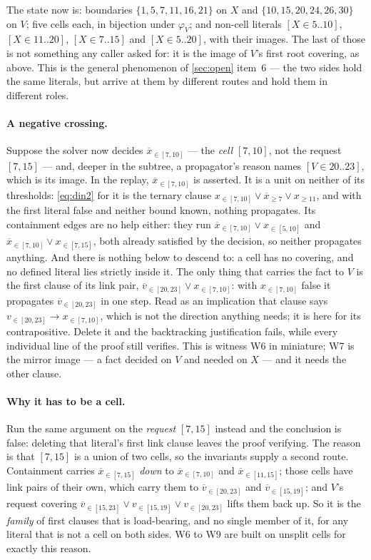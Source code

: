 \documentclass[11pt,a4paper]{article}
\theoremstyle{plain}
\theoremstyle{definition}
\theoremstyle{remark}
\newcommand{\atge}[2]{#1_{\geq #2}}
\newcommand{\atin}[3]{#1_{\in[#2,#3]}}
\newcommand{\natge}[2]{\overline{#1}_{\geq #2}}
\newcommand{\natin}[3]{\overline{#1}_{\in[#2,#3]}}
\begin{document}
The state now is: boundaries $\{1,5,7,11,16,21\}$ on $X$ and
$\{10,15,20,24,26,30\}$ on $V$; five cells each, in bijection under $\varphi_V$;
and non-cell literals $[X\in 5..10]$, $[X\in 11..20]$, $[X\in 7..15]$ and
$[X\in 5..20]$, with their images.  The last of those is not something any
caller asked for: it is the image of $V$'s first root covering, as above.  This
is the general phenomenon of \cref{sec:open} item~6 --- the two sides hold the
same literals, but arrive at them by different routes and hold them in different
roles.

\paragraph{A negative crossing.}
Suppose the solver now decides $\natin{x}{7}{10}$ --- the \emph{cell} $[7,10]$,
not the request $[7,15]$ --- and, deeper in the subtree, a propagator's reason
names $[V\in 20..23]$, which is its image.  In the replay,
$\natin{x}{7}{10}$ is asserted.  It is a unit on neither of its thresholds:
\cref{eq:din2} for it is the ternary clause
$\atin{x}{7}{10}\vee\natge{x}{7}\vee\atge{x}{11}$, and with the first literal
false and neither bound known, nothing propagates.  Its containment edges are no
help either: they run $\natin{x}{7}{10}\vee\atin{x}{5}{10}$ and
$\natin{x}{7}{10}\vee\atin{x}{7}{15}$, both already satisfied by the decision, so
neither propagates anything.  And there is nothing below to descend to: a cell
has no covering, and no defined literal lies strictly inside it.  The only thing
that
carries the fact to $V$ is the first clause of its link pair,
$\natin{v}{20}{23}\vee\atin{x}{7}{10}$: with $\atin{x}{7}{10}$ false it
propagates $\natin{v}{20}{23}$ in one step.  Read as an implication that clause
says $\atin{v}{20}{23}\to\atin{x}{7}{10}$, which is not the direction anything
needs; it is here for its contrapositive.  Delete it and the backtracking
justification fails, while every individual line of the proof still verifies.
This is witness W6 in miniature; W7 is the mirror image --- a fact decided on
$V$ and needed on $X$ --- and it needs the other clause.

\paragraph{Why it has to be a cell.}
Run the same argument on the \emph{request} $[7,15]$ instead and the conclusion
is false: deleting that literal's first link clause leaves the proof verifying.
The reason is that $[7,15]$ is a union of two cells, so the invariants supply a
second route. Containment carries $\natin{x}{7}{15}$ \emph{down} to
$\natin{x}{7}{10}$ and $\natin{x}{11}{15}$; those cells have link pairs of their
own, which carry them to $\natin{v}{20}{23}$ and $\natin{v}{15}{19}$; and $V$'s
request covering
$\natin{v}{15}{23}\vee\atin{v}{15}{19}\vee\atin{v}{20}{23}$ lifts them back up.
So it is the \emph{family} of first clauses that is load-bearing, and no single
member of it, for any literal that is not a cell on both sides.  W6 to W9 are
built on unsplit cells for exactly this reason.
\end{document}
